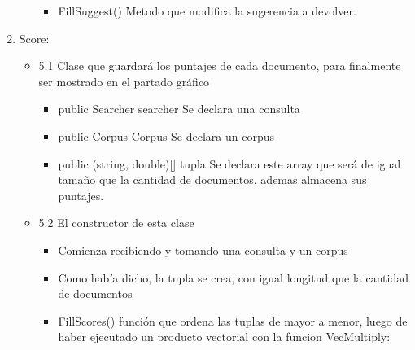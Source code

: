 \documentclass{article}
\begin{document}
\begin{enumerate}
\begin{itemize}
\begin{itemize}
                \item FillSuggest() Metodo que modifica la sugerencia a devolver.
            \end{itemize}
        \end{itemize}
    \item Score:
        \begin{itemize}
            \item 5.1 Clase que guardará los puntajes de cada documento, para finalmente ser mostrado en el partado gráfico
            \begin{itemize}
                \item public Searcher searcher Se declara una consulta
                \item public Corpus Corpus Se declara un corpus
                \item public (string, double)[] tupla Se declara este array que será de igual tamaño que la cantidad de documentos, ademas almacena sus puntajes.
            \end{itemize}
            \newpage
            \item 5.2 El constructor de esta clase
            \begin{itemize}
                \item Comienza recibiendo y tomando una consulta y un corpus
                \item Como había dicho, la tupla se crea, con igual longitud que la cantidad de documentos
                \item FillScores() función que ordena las tuplas de mayor a menor, luego de haber ejecutado un producto vectorial con la funcion VecMultiply:
                


\end{itemize}
\end{itemize}
\end{enumerate}
\end{document}
